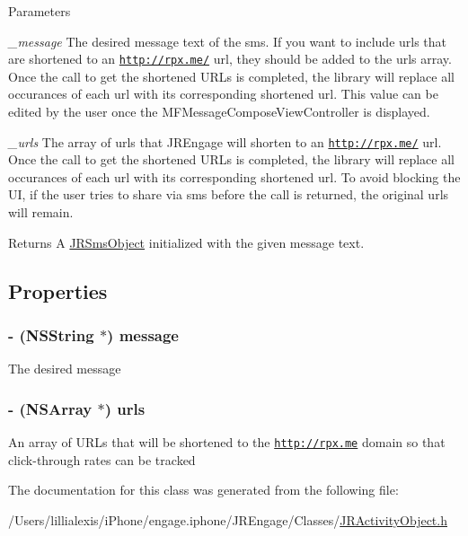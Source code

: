 \begin{DoxyParams}{Parameters}
\item[{\em \_\-message}]The desired message text of the sms. If you want to include urls that are shortened to an \href{http://rpxnow.com/docs/iphone#shortenUrls}{\tt http://rpx.me/} url, they should be added to the {\ttfamily urls} array. Once the call to get the shortened URLs is completed, the library will replace all occurances of each url with its corresponding shortened url. This value can be edited by the user once the MFMessageComposeViewController is displayed.\item[{\em \_\-urls}]The array of urls that JREngage will shorten to an \href{http://rpxnow.com/docs/iphone#shortenUrls}{\tt http://rpx.me/} url. Once the call to get the shortened URLs is completed, the library will replace all occurances of each url with its corresponding shortened url. To avoid blocking the UI, if the user tries to share via sms before the call is returned, the original urls will remain.\end{DoxyParams}
\begin{DoxyReturn}{Returns}
A \hyperlink{interface_j_r_sms_object}{JRSmsObject} initialized with the given message text. 
\end{DoxyReturn}


\subsection{Properties}
\hypertarget{interface_j_r_sms_object_a6d74c049eba0e6ecfae0e25cffd77d6e}{
\subsubsection[{message}]{\setlength{\rightskip}{0pt plus 5cm}-\/ (NSString $\ast$) message}}
\label{interface_j_r_sms_object_a6d74c049eba0e6ecfae0e25cffd77d6e}
The desired message \hypertarget{interface_j_r_sms_object_a181c9385d2dc5ade8b096e2302a47a50}{
\subsubsection[{urls}]{\setlength{\rightskip}{0pt plus 5cm}-\/ (NSArray $\ast$) urls}}
\label{interface_j_r_sms_object_a181c9385d2dc5ade8b096e2302a47a50}
An array of URLs that will be shortened to the \href{http://rpx.me}{\tt http://rpx.me} domain so that click-\/through rates can be tracked 

The documentation for this class was generated from the following file:\begin{DoxyCompactItemize}
\item 
/Users/lillialexis/iPhone/engage.iphone/JREngage/Classes/\hyperlink{_j_r_activity_object_8h}{JRActivityObject.h}\end{DoxyCompactItemize}
